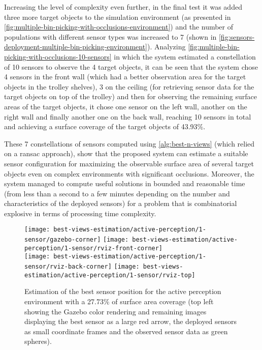 Increasing the level of complexity even further, in the final test it was added three more target objects to the simulation environment (as presented in \cref{fig:multiple-bin-picking-with-occlusions-environment}) and the number of populations with different sensor types was increased to 7 (shown in \cref{fig:sensors-deployment-multiple-bin-picking-environment}). Analyzing \cref{fig:multiple-bin-picking-with-occlusions-10-sensors} in which the system estimated a constellation of 10 sensors to observe the 4 target objects, it can be seen that the system chose 4 sensors in the front wall (which had a better observation area for the target objects in the trolley shelves), 3 on the ceiling (for retrieving sensor data for the target objects on top of the trolley) and then for observing the remaining surface areas of the target objects, it chose one sensor on the left wall, another on the right wall and finally another one on the back wall, reaching 10 sensors in total and achieving a surface coverage of the target objects of 43.93\%.

These 7 constellations of sensors computed using \cref{alg:best-n-views} (which relied on a \gls{ransac} approach), show that the proposed system can estimate a suitable sensor configuration for maximizing the observable surface area of several target objects even on complex environments with significant occlusions. Moreover, the system managed to compute useful solutions in bounded and reasonable time (from less than a second to a few minutes depending on the number and characteristics of the deployed sensors) for a problem that is combinatorial explosive in terms of processing time complexity.

\begin{figure}
	\centering
	\texttt{[image: best-views-estimation/active-perception/1-sensor/gazebo-corner]}\hspace{4em}
	\texttt{[image: best-views-estimation/active-perception/1-sensor/rviz-front-corner]}\\
	\texttt{[image: best-views-estimation/active-perception/1-sensor/rviz-back-corner]}\hspace{2em}
	\texttt{[image: best-views-estimation/active-perception/1-sensor/rviz-top]}
	\caption{Estimation of the best sensor position for the active perception environment with a 27.73\% of surface area coverage (top left showing the Gazebo color rendering and remaining images displaying the best sensor as a large red arrow, the deployed sensors as small coordinate frames and the observed sensor data as green spheres).}
	\label{fig:active-perception-1-sensor}
\end{figure}

